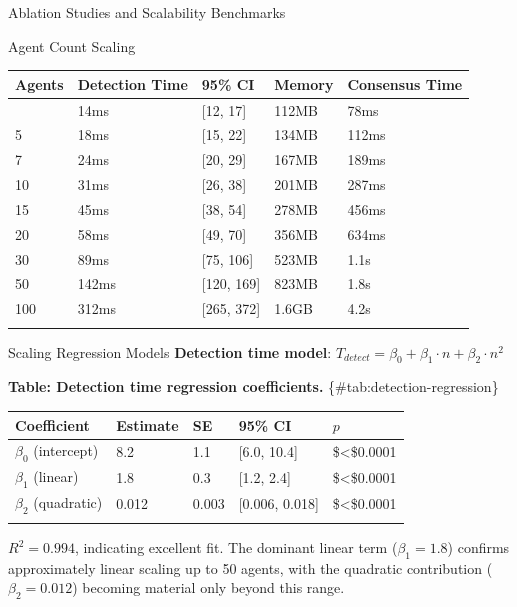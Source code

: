 \documentclass[
  ignorenonframetext,
]{beamer}
\newcounter{none} %
\begin{document}
\begin{frame}[fragile]{Ablation Studies and Scalability Benchmarks}
\begin{block}{Agent Count Scaling}
{\def\LTcaptype{none} %
\begin{longtable}[]{@{}lllll@{}}
\toprule\noalign{}
Agents & Detection Time & 95\% CI & Memory & Consensus Time \\
\midrule\noalign{}
\endhead
3 & 14ms & {[}12, 17{]} & 112MB & 78ms \\
5 & 18ms & {[}15, 22{]} & 134MB & 112ms \\
7 & 24ms & {[}20, 29{]} & 167MB & 189ms \\
10 & 31ms & {[}26, 38{]} & 201MB & 287ms \\
15 & 45ms & {[}38, 54{]} & 278MB & 456ms \\
20 & 58ms & {[}49, 70{]} & 356MB & 634ms \\
30 & 89ms & {[}75, 106{]} & 523MB & 1.1s \\
50 & 142ms & {[}120, 169{]} & 823MB & 1.8s \\
100 & 312ms & {[}265, 372{]} & 1.6GB & 4.2s \\
\bottomrule\noalign{}
\end{longtable}
}
\end{block}

\begin{block}{Scaling Regression Models}
\protect{}\label{sec:regression}
\textbf{Detection time model}:
\(T_{detect} = \beta_0 + \beta_1 \cdot n + \beta_2 \cdot n^2\)

\textbf{Table: Detection time regression coefficients.}
\{\#tab:detection-regression\}

{\def\LTcaptype{none} %
\begin{longtable}[]{@{}lllll@{}}
\toprule\noalign{}
Coefficient & Estimate & SE & 95\% CI & \(p\) \\
\midrule\noalign{}
\endhead
\(\beta_0\) (intercept) & 8.2 & 1.1 & {[}6.0, 10.4{]} &
\$\textless\$0.0001 \\
\(\beta_1\) (linear) & 1.8 & 0.3 & {[}1.2, 2.4{]} &
\$\textless\$0.0001 \\
\(\beta_2\) (quadratic) & 0.012 & 0.003 & {[}0.006, 0.018{]} &
\$\textless\$0.0001 \\
\bottomrule\noalign{}
\end{longtable}
}

\(R^2 = 0.994\), indicating excellent fit. The dominant linear term
(\(\beta_1 = 1.8\)) confirms approximately linear scaling up to 50
agents, with the quadratic contribution (\(\beta_2 = 0.012\)) becoming
material only beyond this range.


\end{block}
\end{frame}
\end{document}
